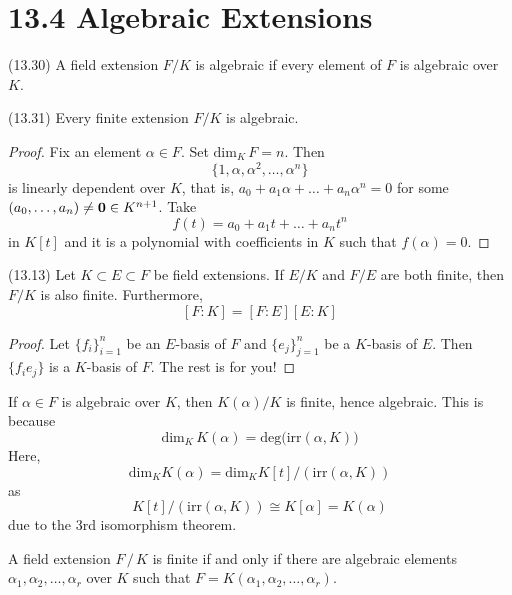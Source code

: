 \section{13.4 Algebraic Extensions}
\begin{defi}
(13.30) A field extension $F/K$ is algebraic if every element of $F$ is algebraic over $K$. 
\end{defi}
\vspace{2ex}
\begin{prop}
(13.31) Every finite extension $F/K$ is algebraic.
\end{prop}
\vspace{2ex}
\begin{proof}
Fix an element $\alpha \in F$. Set $\mathrm{dim}_{K}\,F=n$. Then
\[\{1,\alpha ,\alpha ^2,\ldots ,\alpha ^{n}\}\]
is linearly dependent over $K$, that is, $a_0+a_1\alpha +\ldots +a_{n}\alpha ^{n}=0$ for some $(a_0,\ldots ,a_{n})\ne {\bf 0}\in K^{n+1}$. Take
\[f(t)=a_0+a_1t+\ldots +a_{n}t^{n}\]
in $K[t]$ and it is a polynomial with coefficients in $K$ such that $f(\alpha )=0$.
\end{proof}
\vspace{2ex}
\begin{prop}
(13.13) Let $K\subset E\subset F$ be field extensions. If $E/K$ and $F/E$ are both finite, then $F/K$ is also finite. Furthermore, 
\[[F:K]=[F:E][E:K]\]
\end{prop}
\vspace{2ex}
\begin{proof}
Let $\{f_{i}\}^{n}_{i=1}$ be an $E$-basis of $F$ and $\{e_{j}\}^{n}_{j=1}$ be a $K$-basis of $E$. Then $\{f_{i}e_{j}\}$ is a $K$-basis of $F$. The rest is for you!
\end{proof}
\vspace{2ex}
\begin{rmk}
If $\alpha \in F$ is algebraic over $K$, then $K(\alpha )/K$ is finite, hence algebraic. This is because 
\[\mathrm{dim}_{K}\,K(\alpha )= \mathrm{deg}\Big(\mathrm{irr}(\alpha ,K)\Big)\]
Here,
\[\mathrm{dim}_{K}K(\alpha )=\mathrm{dim}_{K}K[t]/(\mathrm{irr}(\alpha ,K))\]
as
\[K[t]/(\mathrm{irr}(\alpha ,K))\cong K[\alpha ]=K(\alpha )\]
due to the 3rd isomorphism theorem.
\end{rmk}
\vspace{2ex}
\begin{prop}
A field extension $F\,/\,K$ is finite if and only if there are algebraic elements $\alpha_1,\alpha_2,\ldots,\alpha_{r}$ over $K$ such that $F=K(\alpha_1,\alpha_2,\ldots ,\alpha_{r})$.
\begin{center}
\end{center}
\end{prop}
